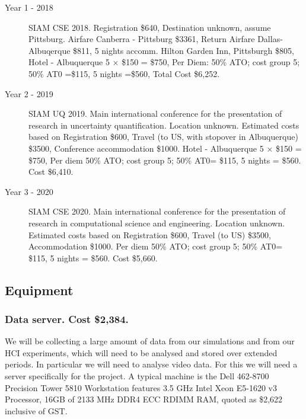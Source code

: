\documentclass[a4paper,fontsize=12pt]{scrartcl}
\begin{document}
\begin{description}
\item[Year 1 - 2018] SIAM CSE 2018.
Registration \$640, 
Destination unknown, assume Pittsburg.
Airfare Canberra - Pittsburg \$3361,
Return Airfare Dallas-Albuqerque \$811,
5 nights accomm. Hilton Garden Inn, Pittsburgh \$805,  
Hotel - Albuquerque 5 $\times$  \$150 = \$750,
Per Diem: 50\% ATO; cost group 5; 50\% AT0 =\$115, 5 nights =\$560, Total Cost \$6,252.

\item[Year 2 - 2019] SIAM UQ 2019.
Main international conference for the presentation of research in uncertainty quantification. Location unknown.
Estimated costs based on 
Registration \$600,
Travel (to US, with stopover in Albuquerque) \$3500, 
Conference accommodation \$1000.
Hotel - Albuquerque 5 $\times$  \$150 = \$750,
Per diem 50\% ATO; cost group 5; 50\% AT0= \$115, 5 nights = \$560. Cost \$6,410.

\item[Year 3 - 2020]  SIAM CSE 2020.
Main international conference for the presentation of research in computational science and engineering. Location unknown.
Estimated costs based on 
Registration \$600,
Travel (to US) \$3500, 
Accommodation \$1000.
Per diem 50\% ATO; cost group 5; 50\% AT0= \$115, 5 nights = \$560. Cost \$5,660.

\end{description}

\subsection*{Equipment}

\subsubsection*{Data server. Cost \$2,384.}

We will be collecting a large amount of data from our simulations and from our HCI experiments, which will need to be analysed and stored over extended periods. In particular we will need to analyse video data.  For this we will need a server specifically for the project. A typical machine is the Dell 462-8700 Precision Tower 5810 Workstation features 3.5 GHz Intel Xeon E5-1620 v3 Processor, 16GB of 2133 MHz DDR4 ECC RDIMM RAM, quoted as \$2,622 inclusive of GST.  


\end{document}
